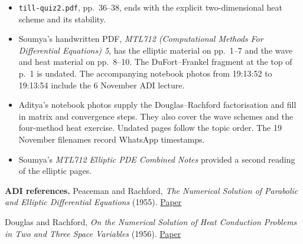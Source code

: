 \documentclass[11pt,a4paper]{article}
\numberwithin{equation}{section}
\begin{document}
\begin{itemize}\setlength{\itemsep}{2pt}\setlength{\parsep}{0pt}
\item \texttt{till-quiz2.pdf}, pp.\ 36--38, ends with the explicit two-dimensional heat scheme and its stability.
\item Soumya's handwritten PDF, \emph{MTL712 (Computational Methods For Differential Equations) 5}, has the elliptic material on pp.\ 1--7 and the wave and heat material on pp.\ 8--10. The DuFort--Frankel fragment at the top of p.\ 1 is undated. The accompanying notebook photos from 19:13:52 to 19:13:54 include the 6 November ADI lecture.
\item Aditya's notebook photos supply the Douglas--Rachford factorisation and fill in matrix and convergence steps. They also cover the wave schemes and the four-method heat exercise. Undated pages follow the topic order. The 19 November filenames record WhatsApp timestamps.
\item Soumya's \emph{MTL712 Elliptic PDE Combined Notes} provided a second reading of the elliptic pages.
\end{itemize}

\textbf{ADI references.}
Peaceman and Rachford, \emph{The Numerical Solution of Parabolic and Elliptic Differential Equations} (1955). \href{https://doi.org/10.1137/0103003}{Paper}

Douglas and Rachford, \emph{On the Numerical Solution of Heat Conduction Problems in Two and Three Space Variables} (1956). \href{https://doi.org/10.1090/S0002-9947-1956-0084194-4}{Paper}
\endgroup
\end{document}
